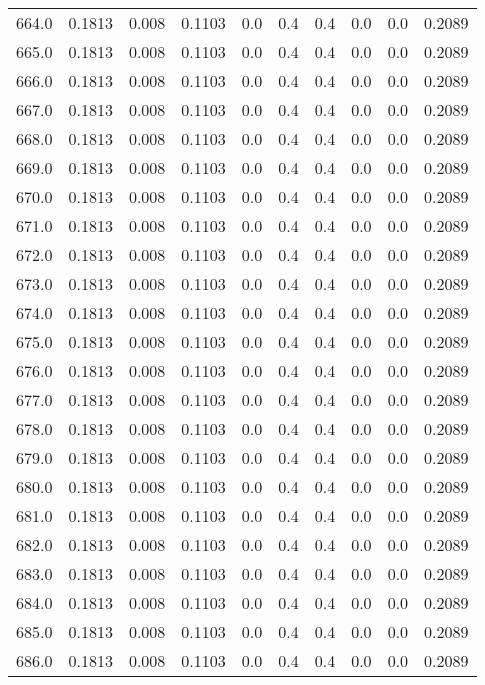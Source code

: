 \begin{longtable}{lrrrrrrrrr}
664.0 & 0.1813 & 0.008 & 0.1103 & 0.0 & 0.4 & 0.4 & 0.0 & 0.0 & 0.2089 \\
665.0 & 0.1813 & 0.008 & 0.1103 & 0.0 & 0.4 & 0.4 & 0.0 & 0.0 & 0.2089 \\
666.0 & 0.1813 & 0.008 & 0.1103 & 0.0 & 0.4 & 0.4 & 0.0 & 0.0 & 0.2089 \\
667.0 & 0.1813 & 0.008 & 0.1103 & 0.0 & 0.4 & 0.4 & 0.0 & 0.0 & 0.2089 \\
668.0 & 0.1813 & 0.008 & 0.1103 & 0.0 & 0.4 & 0.4 & 0.0 & 0.0 & 0.2089 \\
669.0 & 0.1813 & 0.008 & 0.1103 & 0.0 & 0.4 & 0.4 & 0.0 & 0.0 & 0.2089 \\
670.0 & 0.1813 & 0.008 & 0.1103 & 0.0 & 0.4 & 0.4 & 0.0 & 0.0 & 0.2089 \\
671.0 & 0.1813 & 0.008 & 0.1103 & 0.0 & 0.4 & 0.4 & 0.0 & 0.0 & 0.2089 \\
672.0 & 0.1813 & 0.008 & 0.1103 & 0.0 & 0.4 & 0.4 & 0.0 & 0.0 & 0.2089 \\
673.0 & 0.1813 & 0.008 & 0.1103 & 0.0 & 0.4 & 0.4 & 0.0 & 0.0 & 0.2089 \\
674.0 & 0.1813 & 0.008 & 0.1103 & 0.0 & 0.4 & 0.4 & 0.0 & 0.0 & 0.2089 \\
675.0 & 0.1813 & 0.008 & 0.1103 & 0.0 & 0.4 & 0.4 & 0.0 & 0.0 & 0.2089 \\
676.0 & 0.1813 & 0.008 & 0.1103 & 0.0 & 0.4 & 0.4 & 0.0 & 0.0 & 0.2089 \\
677.0 & 0.1813 & 0.008 & 0.1103 & 0.0 & 0.4 & 0.4 & 0.0 & 0.0 & 0.2089 \\
678.0 & 0.1813 & 0.008 & 0.1103 & 0.0 & 0.4 & 0.4 & 0.0 & 0.0 & 0.2089 \\
679.0 & 0.1813 & 0.008 & 0.1103 & 0.0 & 0.4 & 0.4 & 0.0 & 0.0 & 0.2089 \\
680.0 & 0.1813 & 0.008 & 0.1103 & 0.0 & 0.4 & 0.4 & 0.0 & 0.0 & 0.2089 \\
681.0 & 0.1813 & 0.008 & 0.1103 & 0.0 & 0.4 & 0.4 & 0.0 & 0.0 & 0.2089 \\
682.0 & 0.1813 & 0.008 & 0.1103 & 0.0 & 0.4 & 0.4 & 0.0 & 0.0 & 0.2089 \\
683.0 & 0.1813 & 0.008 & 0.1103 & 0.0 & 0.4 & 0.4 & 0.0 & 0.0 & 0.2089 \\
684.0 & 0.1813 & 0.008 & 0.1103 & 0.0 & 0.4 & 0.4 & 0.0 & 0.0 & 0.2089 \\
685.0 & 0.1813 & 0.008 & 0.1103 & 0.0 & 0.4 & 0.4 & 0.0 & 0.0 & 0.2089 \\
686.0 & 0.1813 & 0.008 & 0.1103 & 0.0 & 0.4 & 0.4 & 0.0 & 0.0 & 0.2089 \\

\end{longtable}

